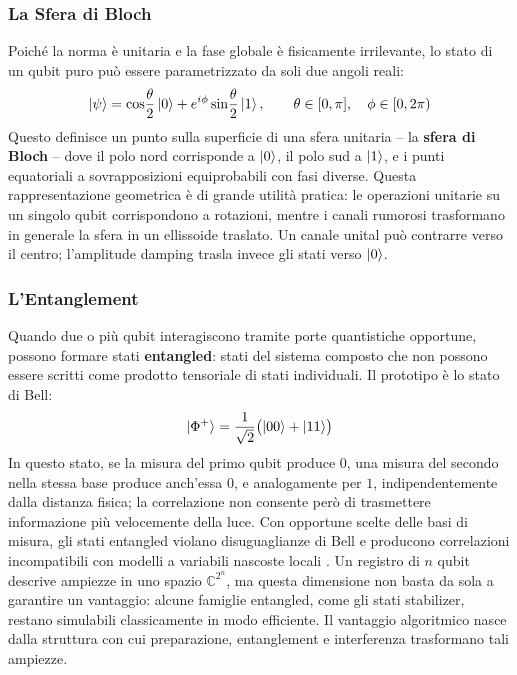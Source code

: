 \begin{onehalfspace}
\subsubsection{La Sfera di Bloch}

Poiché la norma è unitaria e la fase globale è fisicamente irrilevante, lo stato di un qubit puro può essere parametrizzato da soli due angoli reali:
\begin{equation}
    \ket{\psi} = \cos\!\frac{\theta}{2}\ket{0} + e^{i\phi}\sin\!\frac{\theta}{2}\ket{1}, \qquad \theta \in [0,\pi],\quad \phi \in [0,2\pi)
    \label{eq:bloch_parametrization}
\end{equation}
Questo definisce un punto sulla superficie di una sfera unitaria -- la \textbf{sfera di Bloch} -- dove il polo nord corrisponde a $\ket{0}$, il polo sud a $\ket{1}$, e i punti equatoriali a sovrapposizioni equiprobabili con fasi diverse. Questa rappresentazione geometrica è di grande utilità pratica: le operazioni unitarie su un singolo qubit corrispondono a rotazioni, mentre i canali rumorosi trasformano in generale la sfera in un ellissoide traslato. Un canale unital può contrarre verso il centro; l'amplitude damping trasla invece gli stati verso $\ket{0}$.

\subsubsection{L'Entanglement}

Quando due o più qubit interagiscono tramite porte quantistiche opportune, possono formare stati \textbf{entangled}: stati del sistema composto che non possono essere scritti come prodotto tensoriale di stati individuali. Il prototipo è lo stato di Bell:
\begin{equation}
    \ket{\Phi^+} = \frac{1}{\sqrt{2}}\bigl(\ket{00} + \ket{11}\bigr)
    \label{eq:bell_state}
\end{equation}
In questo stato, se la misura del primo qubit produce $0$, una misura del secondo nella stessa base produce anch'essa $0$, e analogamente per $1$, indipendentemente dalla distanza fisica; la correlazione non consente però di trasmettere informazione più velocemente della luce. Con opportune scelte delle basi di misura, gli stati entangled violano disuguaglianze di Bell e producono correlazioni incompatibili con modelli a variabili nascoste locali \cite{bell1964,aspect1982}. Un registro di $n$ qubit descrive ampiezze in uno spazio $\mathbb{C}^{2^n}$, ma questa dimensione non basta da sola a garantire un vantaggio: alcune famiglie entangled, come gli stati stabilizer, restano simulabili classicamente in modo efficiente. Il vantaggio algoritmico nasce dalla struttura con cui preparazione, entanglement e interferenza trasformano tali ampiezze.


\end{onehalfspace}
